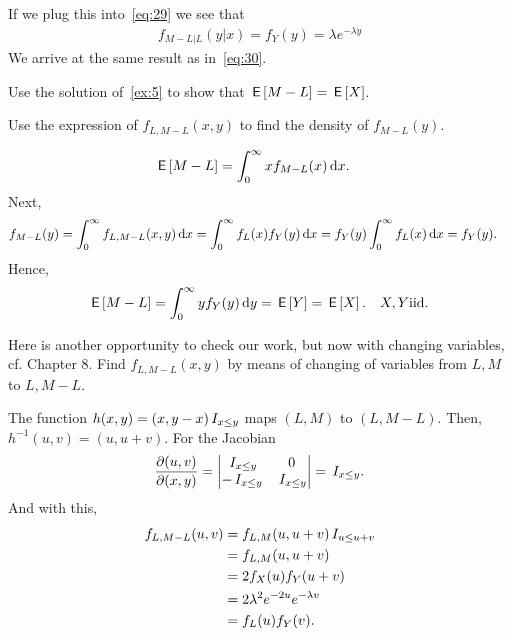 \documentclass[a4paper,12pt]{article}
\begin{document}
\begin{exercise}
\begin{solution}
If we plug this into~\cref{eq:29} we see that
  \begin{align}
f_{M-L| L}(y| x) =  f_Y(y) = \lambda e^{-\lambda y}
  \end{align}
We arrive at  the same result as in~\cref{eq:30}. 

\end{solution}
\end{exercise}

\begin{exercise}
Use the solution of~\cref{ex:5} to show that $\,\mathsf{E}\left[M-L\right] = \,\mathsf{E}\left[X\right]$.
\begin{hint}
Use the expression of $f_{L, M-L}(x,y)$  to find the density of $f_{M-L}(y)$.
\end{hint}
\begin{solution}
  \begin{align}
\,\mathsf{E}\left[M-L\right] 
&= \int_{0}^{\infty} x f_{M-L}(x) \,\textrm{d}x.
  \end{align}
Next, 
\begin{align}
  \label{eq:32}
f_{M-L}(y) 
&= \int_0^\infty f_{L, M-L}(x, y) \,\textrm{d}x  = \int_0^\infty f_{L}(x) f_Y(y) \,\textrm{d}x = f_Y(y) \int_0^{\infty }f_L(x) \,\textrm{d}x = f_Y(y).
\end{align}
Hence, 
\begin{align}
  \label{eq:33}
  \,\mathsf{E}\left[M-L\right] = \int_0^{\infty} y f_Y(y) \,\textrm{d}y = \,\mathsf{E}\left[Y\right] = \,\mathsf{E}\left[X\right]. \quad X, Y \mathrm{iid.}\,
\end{align}

\end{solution}
\end{exercise}

\begin{exercise}
Here is another opportunity to check our work, but now with changing variables, cf. Chapter 8.
Find $f_{L,M-L}(x,y)$ by means of changing of variables from $L,M$ to $L,M-L$.
\begin{solution}
  The function $h(x,y)= (x, y-x)\,I_{x\leq y}$ maps $(L,M)$ to $(L, M-L)$. Then, $h^{-1}(u,v) = (u, u+v)$. For the Jacobian
  \begin{align}
    \label{eq:57}
\frac{\partial (u,v)}{\partial(x,y)} = 
    \begin{vmatrix}
      \,I_{x\leq y} & 0 \\
-\,I_{x\leq y} & \,I_{x\leq y}
    \end{vmatrix} = \,I_{x\leq y}.
  \end{align}
And with this,
\begin{align}
  \label{eq:19}
f_{L, M-L}(u,v) 
&= f_{L, M}(u, u+v) \,I_{u\leq u+v}  \\
&= f_{L,M}(u, u+v) \\
&= 2 f_{X}(u) f_Y(u+v) \\
&= 2 \lambda^{2}e^{-2u} e^{-\lambda v} \\
&= f_{L}(u) f_Y(v).
\end{align}

\end{solution}
\end{exercise}
\end{document}
